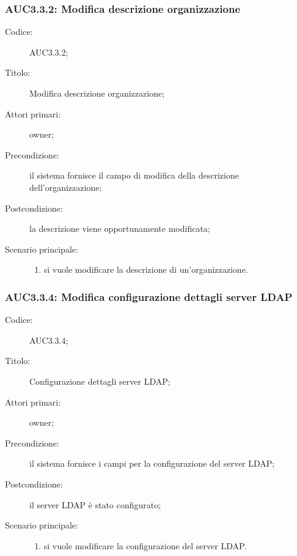 \documentclass[../../../analisi-dei-requisiti.tex]{subfiles}
\begin{document}
\subsubsection{AUC3.3.2: Modifica descrizione organizzazione}%
\label{subs:AUC3.3.2}
\begin{description}
  \item[Codice:] AUC3.3.2;
  \item[Titolo:] Modifica descrizione organizzazione;
  \item[Attori primari:] owner;
  \item[Precondizione:] il sistema fornisce il campo di modifica della descrizione dell'organizzazione;
  \item[Postcondizione:] la descrizione viene opportunamente modificata;
  \item[Scenario principale:]
        \begin{enumerate}
          \item si vuole modificare la descrizione di un'organizzazione.
        \end{enumerate}
\end{description}


\subsubsection{AUC3.3.4: Modifica configurazione dettagli server LDAP}%
\label{subs:AUC3.3.4}
\begin{description}
  \item[Codice:] AUC3.3.4;
  \item[Titolo:] Configurazione dettagli server LDAP;
  \item[Attori primari:] owner;
  \item[Precondizione:] il sistema fornisce i campi per la configurazione del server LDAP;
  \item[Postcondizione:] il server LDAP è stato configurato;
  \item[Scenario principale:]
        \begin{enumerate}
          \item si vuole modificare la configurazione del server LDAP.
        \end{enumerate}
\end{description}
\end{document}
